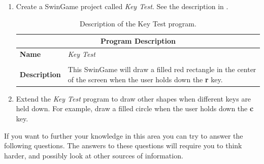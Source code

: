 \begin{enumerate}
  \item Create a SwinGame project called \emph{Key Test}. See the description in .
  \begin{table}[htbp]
  \centering
  \begin{tabular}{l|p{10cm}}
    \hline
    \multicolumn{2}{c}{\textbf{Program Description}} \\
    \hline
    \textbf{Name} & \emph{Key Test} \\
    \\
    \textbf{Description} & This SwinGame will draw a filled red rectangle in the center of the screen when the user holds down the \textbf{r} key.\\
    \hline
  \end{tabular}
  \caption{Description of the Key Test program.}
  \label{tbl:key_test}
  \end{table}
  
  
  \item Extend the \emph{Key Test} program to draw other shapes when different keys are held down. For example, draw a filled circle when the user holds down the \textbf{c} key.
  
\end{enumerate}

\clearpage

If you want to further your knowledge in this area you can try to answer the following questions. The answers to these questions will require you to think harder, and possibly look at other sources of information.


